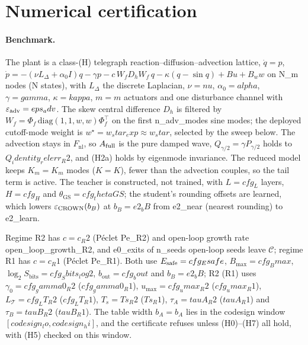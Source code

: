 \section{Numerical certification}
\label{sec:numerics}

\paragraph{Benchmark.}
The plant is a class-(H) telegraph reaction--diffusion--advection lattice, $\dot q = p$, $\dot p = -(\nu L_\Delta + \alpha_0 I)q - \gamma p - c\,W_fD_hW_f\,q - \kappa(q - \sin q) + Bu + B_ww$ on {{N_m}} nodes ({{N}} states), with $L_\Delta$ the discrete Laplacian, $\nu = {{nu}}$, $\alpha_0 = {{alpha}}$, $\gamma = {{gamma}}$, $\kappa = {{kappa}}$, $m = {{m}}$ actuators and one disturbance channel with $\varepsilon_{\mathrm{adv}} = {{eps_adv}}$. The skew central difference $D_h$ is filtered by $W_f = \Phi_f\,\mathrm{diag}(1, 1, w, w)\Phi_f^\top$ on the first {{n_adv_modes}} sine modes; the deployed cutoff-mode weight is $w^\star = {{w_star_exp}} \approx {{w_star}}$, selected by the sweep below. The advection stays in $F_{\mathrm{nl}}$, so $A_{\mathrm{full}}$ is the pure damped wave, $Q_{\gamma/2} = \gamma P_{\gamma/2}$ holds to ${{Q_identity_relerr_R2}}$, and (H2a) holds by eigenmode invariance. The reduced model keeps $K_m = {{K_m}}$ modes ($K = {{K}}$), fewer than the advection couples, so the tail term is active. The teacher is constructed, not trained, with $L = {{cfg_L}}$ layers, $H = {{cfg_H}}$ and $\theta_{\mathrm{GS}} = {{cfg_thetaGS}}$; the student's rounding offsets are learned, which lowers $\varepsilon_{\mathrm{CROWN}}(b_B)$ at $b_B = {{e2_bB}}$ from {{e2_near}} (nearest rounding) to {{e2_learn}}.

Regime R2 has $c = {{c_R2}}$ (P\'eclet {{Pe_R2}}) and open-loop growth rate {{open_loop_growth_R2}}, and {{e0_exits}} of {{n_seeds}} open-loop seeds leave $\mathcal{C}$; regime R1 has $c = {{c_R1}}$ (P\'eclet {{Pe_R1}}). Both use $E_{\mathrm{safe}} = {{cfg_Esafe}}$, $B_{\max} = {{cfg_Bmax}}$, $\log_2 S_{\mathrm{bits}} = {{cfg_Sbits_log2}}$, $b_{\mathrm{out}} = {{cfg_bout}}$ and $b_B = {{e2_bB}}$; R2 (R1) uses $\gamma_0 = {{cfg_gamma0_R2}}$ (${{cfg_gamma0_R1}}$), $u_{\max} = {{cfg_umax_R2}}$ (${{cfg_umax_R1}}$), $L_{\mathcal{T}} = {{cfg_LT_R2}}$ (${{cfg_LT_R1}}$), $T_s = {{Ts_R2}}$ (${{Ts_R1}}$), $\tau_A = {{tauA_R2}}$ (${{tauA_R1}}$) and $\tau_B = {{tauB_R2}}$ (${{tauB_R1}}$). The table width $b_A = {{b_A}}$ lies in the codesign window $[{{codesign_lo}}, {{codesign_hi}}]$, and the certificate refuses unless (H0)--(H7) all hold, with (H5) checked on this window.

